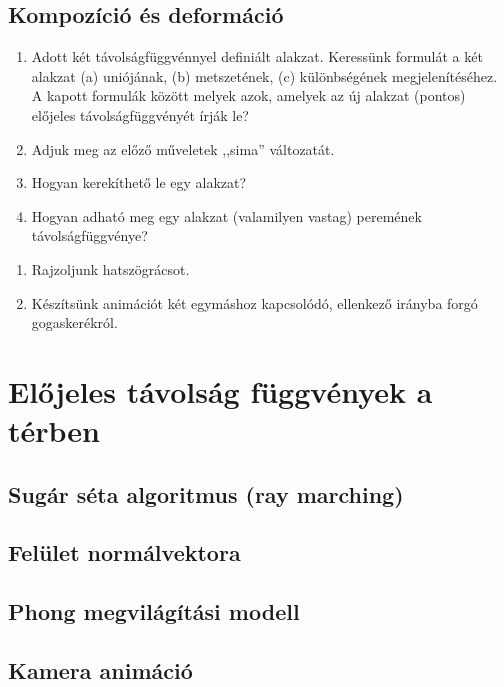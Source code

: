 \subsection{Kompozíció és deformáció}

\matfeladatok

\begin{enumerate}[resume]

\item Adott két távolságfüggvénnyel definiált alakzat. Keressünk formulát a
két alakzat
(a) uniójának,
(b) metszetének,
(c) különbségének megjelenítéséhez. A kapott formulák között melyek azok, amelyek
az új alakzat (pontos) előjeles távolságfüggvényét írják le?

\item Adjuk meg az előző műveletek ,,sima'' változatát.

\item Hogyan kerekíthető le egy alakzat?

\item Hogyan adható meg egy alakzat (valamilyen vastag) peremének távolságfüggvénye?
\end{enumerate}


\progfeladatok
\begin{enumerate}[resume]
  \item Rajzoljunk hatszögrácsot.
  \item Készítsünk animációt két egymáshoz kapcsolódó, ellenkező irányba forgó gogaskerékról.

\end{enumerate}

\section{Előjeles távolság függvények a térben}

\subsection{Sugár séta algoritmus (ray marching)}


\subsection{Felület normálvektora}


\subsection{Phong megvilágítási modell}

\subsection{Kamera animáció}




